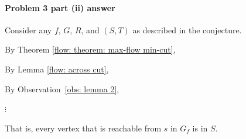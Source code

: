 
\paragraph{Problem 3 part (ii) answer}


\begin{longFormProof}

  \step Consider any $f$, $G$, $R$, and $(S, T)$ as described in the conjecture.

  \step By Theorem \ref{flow: theorem: max-flow min-cut},  \BLUE{ \REPLACEME }

  \step By Lemma \ref{flow: across cut},  \BLUE{ \REPLACEME }

  \step By Observation~\ref{obs: lemma 2}, \BLUE{ \REPLACEME }

  \begin{blue}

    \step \REPLACEME

    \step $\vdots$              %

  \end{blue}

  \step That is, every vertex that is reachable from $s$ in $G_f$ is in $S$.

\end{longFormProof}


